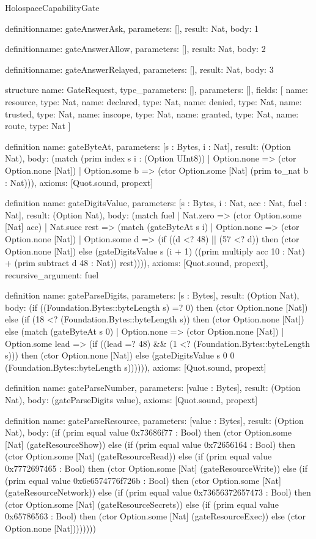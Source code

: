 \begin{lexlean}{HolospaceCapabilityGate}
\begin{semanticmodule}
definition{name: gateAnswerAsk, parameters: [], result: Nat, body: 1}

definition{name: gateAnswerAllow, parameters: [], result: Nat, body: 2}

definition{name: gateAnswerRelayed, parameters: [], result: Nat, body: 3}

structure{
  name: GateRequest,
  type_parameters: [],
  parameters: [],
  fields: [
    {name: resource, type: Nat},
    {name: declared, type: Nat},
    {name: denied, type: Nat},
    {name: trusted, type: Nat},
    {name: inscope, type: Nat},
    {name: granted, type: Nat},
    {name: route, type: Nat}
  ]
}

definition{
  name: gateByteAt,
  parameters: [s : Bytes, i : Nat],
  result: (Option Nat),
  body: (match (prim index s i : (Option UInt8))
    | Option.none => (ctor Option.none [Nat])
    | Option.some b => (ctor Option.some [Nat] (prim to_nat b : Nat))),
  axioms: [Quot.sound, propext]
}

definition{
  name: gateDigitsValue,
  parameters: [s : Bytes, i : Nat, acc : Nat, fuel : Nat],
  result: (Option Nat),
  body: (match fuel
    | Nat.zero => (ctor Option.some [Nat] acc)
    | Nat.succ rest => (match (gateByteAt s i)
      | Option.none => (ctor Option.none [Nat])
      | Option.some d => (if ((d <? 48) || (57 <? d)) then (ctor Option.none [Nat]) else (gateDigitsValue s (i + 1) ((prim multiply acc 10 : Nat) + (prim subtract d 48 : Nat)) rest)))),
  axioms: [Quot.sound, propext],
  recursive_argument: fuel
}

definition{
  name: gateParseDigits,
  parameters: [s : Bytes],
  result: (Option Nat),
  body: (if ((Foundation.Bytes::byteLength s) =? 0) then (ctor Option.none [Nat]) else (if (18 <? (Foundation.Bytes::byteLength s)) then (ctor Option.none [Nat]) else (match (gateByteAt s 0)
    | Option.none => (ctor Option.none [Nat])
    | Option.some lead => (if ((lead =? 48) && (1 <? (Foundation.Bytes::byteLength s))) then (ctor Option.none [Nat]) else (gateDigitsValue s 0 0 (Foundation.Bytes::byteLength s)))))),
  axioms: [Quot.sound, propext]
}

definition{
  name: gateParseNumber,
  parameters: [value : Bytes],
  result: (Option Nat),
  body: (gateParseDigits value),
  axioms: [Quot.sound, propext]
}

definition{
  name: gateParseResource,
  parameters: [value : Bytes],
  result: (Option Nat),
  body: (if (prim equal value 0x73686f77 : Bool) then (ctor Option.some [Nat] (gateResourceShow)) else (if (prim equal value 0x72656164 : Bool) then (ctor Option.some [Nat] (gateResourceRead)) else (if (prim equal value 0x7772697465 : Bool) then (ctor Option.some [Nat] (gateResourceWrite)) else (if (prim equal value 0x6e6574776f726b : Bool) then (ctor Option.some [Nat] (gateResourceNetwork)) else (if (prim equal value 0x73656372657473 : Bool) then (ctor Option.some [Nat] (gateResourceSecrets)) else (if (prim equal value 0x65786563 : Bool) then (ctor Option.some [Nat] (gateResourceExec)) else (ctor Option.none [Nat])))))))
}


\end{semanticmodule}
\end{lexlean}
